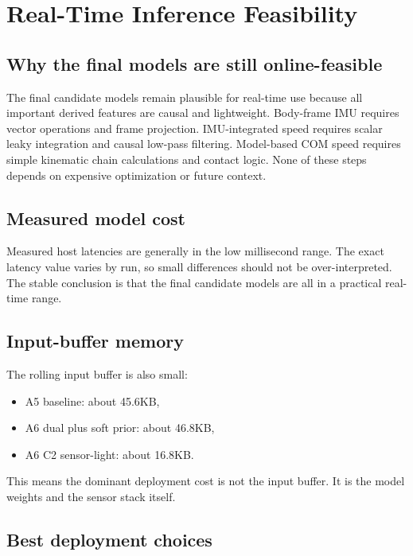\documentclass[11pt,a4paper]{article}
\begin{document}
\section{Real-Time Inference Feasibility}

\subsection{Why the final models are still online-feasible}

The final candidate models remain plausible for real-time use because all important derived features are causal and lightweight. Body-frame IMU requires vector operations and frame projection. IMU-integrated speed requires scalar leaky integration and causal low-pass filtering. Model-based COM speed requires simple kinematic chain calculations and contact logic. None of these steps depends on expensive optimization or future context.

\subsection{Measured model cost}

Measured host latencies are generally in the low millisecond range. The exact latency value varies by run, so small differences should not be over-interpreted. The stable conclusion is that the final candidate models are all in a practical real-time range.

\subsection{Input-buffer memory}

The rolling input buffer is also small:

\begin{itemize}
\item A5 baseline: about 45.6KB,
\item A6 dual plus soft prior: about 46.8KB,
\item A6 C2 sensor-light: about 16.8KB.
\end{itemize}

This means the dominant deployment cost is not the input buffer. It is the model weights and the sensor stack itself.

\subsection{Best deployment choices}
\end{document}
